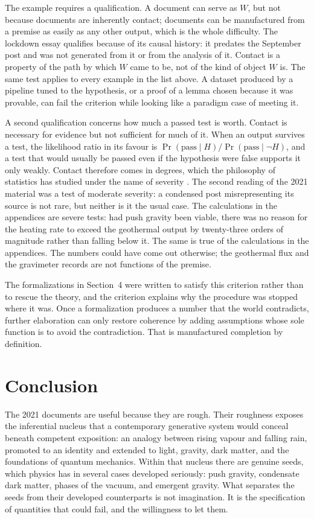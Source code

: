 \documentclass[11pt]{article}
\begin{document}
The example requires a qualification. A document can serve as $W$, but not because documents are inherently contact; documents can be manufactured from a premise as easily as any other output, which is the whole difficulty. The lockdown essay qualifies because of its causal history: it predates the September post and was not generated from it or from the analysis of it. Contact is a property of the path by which $W$ came to be, not of the kind of object $W$ is. The same test applies to every example in the list above. A dataset produced by a pipeline tuned to the hypothesis, or a proof of a lemma chosen because it was provable, can fail the criterion while looking like a paradigm case of meeting it.

A second qualification concerns how much a passed test is worth. Contact is necessary for evidence but not sufficient for much of it. When an output survives a test, the likelihood ratio in its favour is $\Pr(\text{pass}\mid H)/\Pr(\text{pass}\mid\neg H)$, and a test that would usually be passed even if the hypothesis were false supports it only weakly. Contact therefore comes in degrees, which the philosophy of statistics has studied under the name of severity \cite{mayo1996}. The second reading of the 2021 material was a test of moderate severity: a condensed post misrepresenting its source is not rare, but neither is it the usual case. The calculations in the appendices are severe tests: had push gravity been viable, there was no reason for the heating rate to exceed the geothermal output by twenty-three orders of magnitude rather than falling below it. The same is true of the calculations in the appendices. The numbers could have come out otherwise; the geothermal flux and the gravimeter records are not functions of the premise.

The formalizations in Section~4 were written to satisfy this criterion rather than to rescue the theory, and the criterion explains why the procedure was stopped where it was. Once a formalization produces a number that the world contradicts, further elaboration can only restore coherence by adding assumptions whose sole function is to avoid the contradiction. That is manufactured completion by definition.

\section{Conclusion}

The 2021 documents are useful because they are rough. Their roughness exposes the inferential nucleus that a contemporary generative system would conceal beneath competent exposition: an analogy between rising vapour and falling rain, promoted to an identity and extended to light, gravity, dark matter, and the foundations of quantum mechanics. Within that nucleus there are genuine seeds, which physics has in several cases developed seriously: push gravity, condensate dark matter, phases of the vacuum, and emergent gravity. What separates the seeds from their developed counterparts is not imagination. It is the specification of quantities that could fail, and the willingness to let them.
\end{document}
